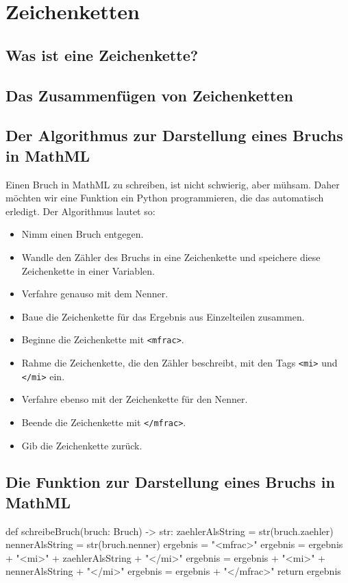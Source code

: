 \section{Zeichenketten}

\subsection{Was ist eine Zeichenkette?}

\subsection{Das Zusammenfügen von Zeichenketten}

\subsection{Der Algorithmus zur Darstellung eines Bruchs in MathML}

Einen Bruch in MathML zu schreiben, ist nicht schwierig, aber mühsam. Daher möchten wir eine Funktion ein Python programmieren, die das automatisch erledigt. Der Algorithmus lautet so:
\begin{itemize}
	\item Nimm einen Bruch entgegen.
	\item Wandle den Zähler des Bruchs in eine Zeichenkette und speichere diese Zeichenkette in einer Variablen.
	\item Verfahre genauso mit dem Nenner.
	\item Baue die Zeichenkette für das Ergebnis aus Einzelteilen zusammen.
	\item Beginne die Zeichenkette mit \texttt{<mfrac>}.
	\item Rahme die Zeichenkette, die den Zähler beschreibt, mit den Tags \texttt{<mi>} und \texttt{</mi>} ein.
	\item Verfahre ebenso mit der Zeichenkette für den Nenner.
	\item Beende die Zeichenkette mit \texttt{</mfrac>}.
	\item Gib die Zeichenkette zurück.
\end{itemize}

\subsection{Die Funktion zur Darstellung eines Bruchs in MathML}

\begin{codePython}
def schreibeBruch(bruch: Bruch) -> str:
	zaehlerAlsString = str(bruch.zaehler)
	nennerAlsString = str(bruch.nenner)
	ergebnis = "<mfrac>"
	ergebnis = ergebnis + "<mi>" + zaehlerAlsString + "</mi>"
	ergebnis = ergebnis + "<mi>" + nennerAlsString + "</mi>"
	ergebnis = ergebnis + "</mfrac>"
	return ergebnis
\end{codePython}